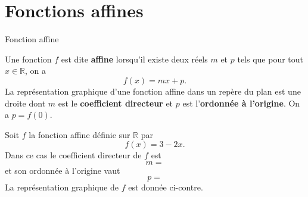 \documentclass[11pt]{article}
\begin{document}
\section{Fonctions affines}
\begin{defi}{Fonction affine}
  \begin{minipage}{.47\textwidth}
  Une fonction $f$ est dite \textbf{affine} lorsqu'il existe deux réels $m$ et
  $p$ tels que pour tout $x\in\mathbb{R}$, on a
  \[
    f(x) = mx + p.
  \]
  La représentation graphique d'une fonction affine dans un repère du plan est
  une droite dont $m$ est le \textbf{coefficient directeur} et $p$ est
  l'\textbf{ordonnée à l'origine}. On a $p=f(0)$.
\end{minipage}
\hfill
  \begin{minipage}{.47\textwidth}
  \begin{center}
  \end{center}
\end{minipage}
\end{defi}

\begin{exemple}
  \begin{minipage}{.47\textwidth}
  Soit $f$ la fonction affine définie sur $\mathbb{R}$ par
  \[
    f(x) = 3-2x.
  \]
  Dans ce cas le coefficient directeur de $f$ est
  \[
    m =
  \]
  et son ordonnée à l'origine vaut
  \[
    p =
  \]
  La représentation graphique de $f$ est donnée ci-contre.
  \end{minipage}
  \hfill
  \begin{minipage}{.47\textwidth}
\begin{center}
\end{center}
  \end{minipage}
\end{exemple}
\end{document}
